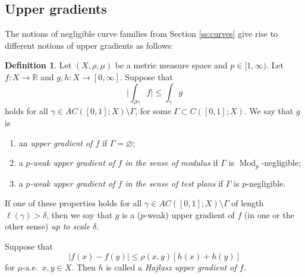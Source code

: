 \documentclass[11pt]{amsart}
\theoremstyle{definition}
\newtheorem{definition}[theorem]{Definition}
\theoremstyle{remark}
\numberwithin{equation}{section}
\newcommand{\abs}[1]{|#1|}
\newcommand{\Babs}[1]{\Big|#1\Big|}
\begin{document}
\subsection{Upper gradients}\label{ss:ug}

The notions of negligible curve families from Section \ref{ss:curves} give rise to different
notions of upper gradients as follows:

\begin{definition}\label{def:uppergrad}
Let $(X,\rho,\mu)$ be a metric measure space and $p\in[1,\infty)$.
Let $f:X\to\mathbb R$ and $g,h:X\to[0,\infty]$.
Suppose that
\begin{equation}\label{eq:uppergrad}
  \Babs{\int_{\partial\gamma}f}\leq\int_\gamma g
\end{equation}
holds for all $\gamma\in AC([0,1];X)\setminus\Gamma$, for some $\Gamma\subset C([0,1];X)$.
We say that $g$ is
\begin{enumerate}[\rm(i)]
  \item an {\em upper gradient of $f$} if $\Gamma=\varnothing$;
  \item a {\em $p$-weak upper gradient of $f$ in the sense of modulus} if $\Gamma$ is
  $\operatorname{Mod}_p$-negligible;
  \item a {\em $p$-weak upper gradient of $f$ in the sense of test plans} if $\Gamma$ is
  $p$-negligible.
\end{enumerate}
If one of these properties holds for all $\gamma\in AC([0,1];X)\setminus\Gamma$ of length
$\ell(\gamma)>\delta$, then we say that $g$ is a ($p$-weak) upper gradient of $f$ (in one or
the other sense) {\em up to scale $\delta$}.

Suppose that
\begin{equation*}
   \abs{f(x)-f(y)}\leq \rho(x,y)[h(x)+h(y)]
\end{equation*}
for $\mu$-a.e.\ $x,y\in X$. Then $h$ is called a {\em Haj\l{}asz upper gradient of $f$}.
\end{definition}
\end{document}
